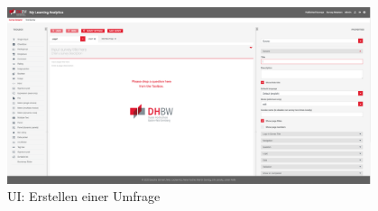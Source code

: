 \begin{figure}[hp]
	\centering
	\includegraphics[width=0.95\textwidth, keepaspectratio]{img/client/CreateSurveyMaster.png}
	\captionsetup{justification=centering, format=plain}
	\caption[\acf{UI}: Erstellen einer Umfrage]{\acf{UI}: Erstellen einer Umfrage \\ \quelleScreenshot}
	\label{fig:SurveyCreatorImplement}
\end{figure}